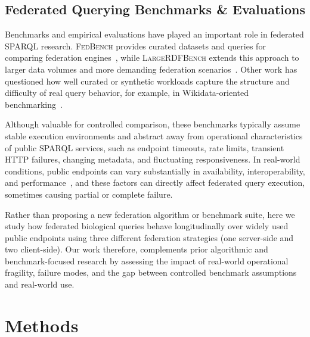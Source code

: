 \documentclass[runningheads]{llncs}
\begin{document}
\subsection{Federated Querying Benchmarks \& Evaluations}\label{sec3.2}
Benchmarks and empirical evaluations have played an important role in federated SPARQL research.
\textsc{FedBench} provides curated datasets and queries for comparing federation engines~\cite{Schmidt2011FedBench,Saleem2014FedBench}, while \textsc{LargeRDFBench} extends this approach to larger data volumes and more demanding federation scenarios~\cite{Saleem2018LargeRDFBench}. 
Other work has questioned how well curated or synthetic workloads capture the structure and difficulty of real query behavior, for example, in Wikidata-oriented benchmarking~\cite{Hernandez2015Wikidata}.

Although valuable for controlled comparison, these benchmarks typically assume stable execution environments and abstract away from operational characteristics of public SPARQL services, such as endpoint timeouts, rate limits, transient HTTP failures, changing metadata, and fluctuating responsiveness.
In real-world conditions, public endpoints can vary substantially in availability, interoperability, and performance~\cite{Vandenbussche2017SPARQLES}, and these factors can directly affect federated query execution, sometimes causing partial or complete failure.

Rather than proposing a new federation algorithm or benchmark suite, here we study how federated biological queries behave longitudinally over widely used public endpoints using three different federation strategies (one server-side and two client-side).
Our work therefore, complements prior algorithmic and benchmark-focused research by assessing the impact of real-world operational fragility, failure modes, and the gap between controlled benchmark assumptions and real-world use.


\section{Methods}\label{sec4}
\end{document}

